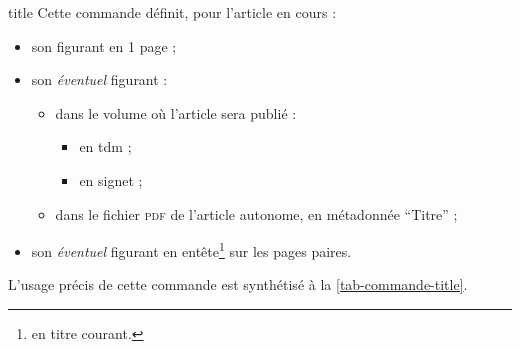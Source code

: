 \documentclass[french,nolocaltoc]{nwejmart}
\newtheorem[style=definition]{fait}
\newtheorem[title=expérience]{experience}
\newtheorem[title-plural=anneaux]{anneau}
\newtheorem[title=idéal,title-plural=idéaux]{ideal}
\begin{document}
\begin{docCommand}[doc new=2017-10-23]{title}{}
  Cette commande définit, pour l'article en cours :
  \begin{itemize}
  \item son  figurant en 1\iere{} page ;
  \item son \emph{éventuel}  figurant :
    \begin{itemize}
    \item dans le volume où l'article sera publié :
      \begin{itemize}
      \item en \gls{tdm} ;
      \item en signet ;
      \end{itemize}
    \item dans le fichier \textsc{pdf} de l'article autonome, en métadonnée
      \enquote{Titre} ;
    \end{itemize}
  \item son \emph{éventuel}  figurant en
    entête\footnote{\Ie{} en titre courant.} sur les pages paires.
  \end{itemize}
  L'usage précis de cette commande est synthétisé à la
  \vref{tab-commande-title}.
\end{docCommand}
\end{document}
